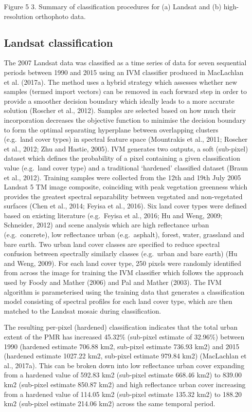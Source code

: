 \documentclass[]{book}
\begin{document}
Figure 5 3. Summary of classification procedures for (a) Landsat and (b)
high-resolution orthophoto data.

\subsection{Landsat classification}\label{landsat-classification}

The 2007 Landsat data was classified as a time series of data for seven
sequential periods between 1990 and 2015 using an IVM classifier
produced in MacLachlan et al. (2017a). The method uses a hybrid strategy
which assesses whether new samples (termed import vectors) can be
removed in each forward step in order to provide a smoother decision
boundary which ideally leads to a more accurate solution (Roscher et
al., 2012). Samples are selected based on how much their incorporation
decreases the objective function to minimise the decision boundary to
form the optimal separating hyperplane between overlapping clusters
(e.g.~land cover types) in spectral feature space (Mountrakis et al.,
2011; Roscher et al., 2012; Zhu and Hastie, 2005). IVM generates two
outputs, a soft (sub-pixel) dataset which defines the probability of a
pixel containing a given classification value (e.g.~land cover type) and
a traditional `hardened' classified dataset (Braun et al., 2012).
Training samples were collected from the 12th and 19th July 2005 Landsat
5 TM image composite, coinciding with peak vegetation greenness which
provides the greatest spectral separability between vegetated and
non-vegetated surfaces (Chen et al., 2014; Feyisa et al., 2016). Six
land cover types were defined based on existing literature (e.g.~Feyisa
et al., 2016; Hu and Weng, 2009; Schneider, 2012) and scene analysis
which are high reflectance urban (e.g.~concrete), low reflectance urban
(e.g.~asphalt), forest, water, grassland and bare earth. Two urban land
cover classes are specified to reduce spectral confusion between
spectrally similarly classes (e.g.~urban and bare earth) (Hu and Weng,
2009). For each land cover type, 250 pixels were randomly identified
from across the image for training the IVM classifier which follows the
approach used by Foody and Mather (2006) and Pal and Mather (2003). The
IVM algorithm is parameterised using the training data that generates a
classification model consisting of spectral profiles for each land cover
type, which are then matched to the Landsat mosaic during
classification.

The resulting per-pixel (hardened) classification indicates that the
total urban extent of the PMR has increased 45.32\% (sub-pixel estimate
of 32.96\%) between 1990 (hardened estimate 706.88 km2, sub-pixel
estimate 736.93 km2) and 2015 (hardened estimate 1027.22 km2, sub-pixel
estimate 979.84 km2) (MacLachlan et al., 2017a). This can be broken down
into low reflectance urban cover expanding from a hardened value of
592.83 km2 (sub-pixel estimate 668.46 km2) to 839.00 km2 (sub-pixel
estimate 850.87 km2) and high reflectance urban cover increasing from a
hardened value of 114.05 km2 (sub-pixel estimate 135.32 km2) to 188.20
km2 (sub-pixel estimate 214.06 km2) across the same temporal period.
\end{document}
